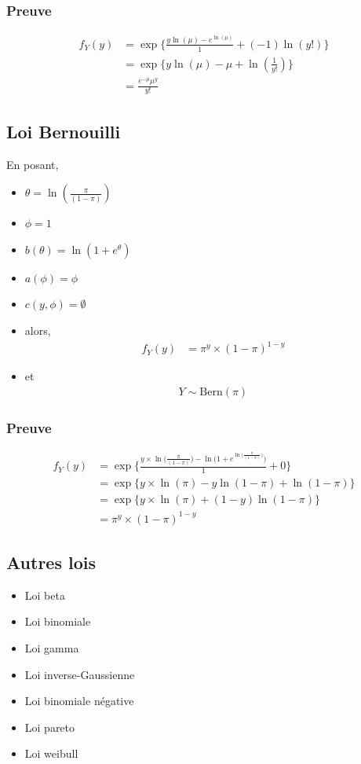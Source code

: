 \documentclass[11pt,french]{report}
\newcommand{\fact}[1]{#1\mathpunct{}!}
\begin{document}
\subsubsection*{Preuve}
\begin{align*}
f_Y(y) &= \exp\Bigg\lbrace \frac{y \ln(\mu) - e^{\ln(\mu)}}{1} + (-1) \ln(\fact{y}) \Bigg\rbrace \\
&= \exp\Bigg\lbrace y \ln(\mu) - \mu + \ln(\frac{1}{\fact{y}}) \Bigg\rbrace \\
&= \frac{e^{-\mu}\mu^y}{\fact{y}}
\end{align*}

\subsection{Loi Bernouilli}
En posant,
\begin{itemize}
     \item $\theta = \ln(\frac{\pi}{(1 -\pi)})$
     \item $\phi = 1$
     \item $b(\theta) = \ln(1 + e^{\theta})$
     \item $a(\phi) = \phi$
     \item $c(y, \phi) = \emptyset$
     \item[] alors,
     \begin{align*}
          f_Y(y) &= \pi^y \times (1 - \pi)^{1 - y}
     \end{align*}
     \item[] et
     \begin{align*}
          Y \sim \text{Bern}(\pi)
     \end{align*}
\end{itemize}

\subsubsection*{Preuve}
\begin{align*}
f_Y(y) &= \exp\Bigg\lbrace \frac{y \times \ln\big(\frac{\pi}{(1 -\pi)}\big) - \ln\big( 1 + e^{\ln\big(\frac{\pi}{(1 -\pi)}\big)}\big)}{1} + 0 \Bigg\rbrace \\
&= \exp\Bigg\lbrace y \times \ln(\pi) - y \ln(1 -\pi) + \ln( 1 -\pi) \Bigg\rbrace \\
&= \exp\Bigg\lbrace y \times \ln(\pi) + (1 - y) \ln(1 -\pi) \Bigg\rbrace \\
&= \pi^y \times (1 - \pi)^{1 - y}
\end{align*}

\subsection{Autres lois}
\begin{itemize}
\item Loi beta
\item Loi binomiale
\item Loi gamma
\item Loi inverse-Gaussienne
\item Loi binomiale négative
\item Loi pareto
\item Loi weibull
\end{itemize}
\end{document}
